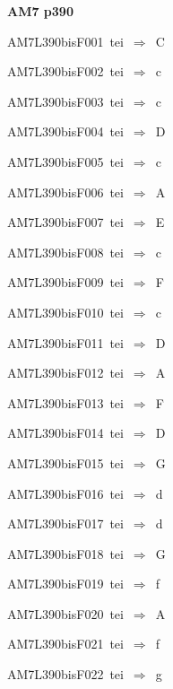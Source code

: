 \par\vfill\eject
{\bf\hfill AM7 p390\hfill\hbox{}}\par\bigskip
{\sixrm AM7L390bisF001\ {\sixit tei}\ }$\Rightarrow$\ C\par\smallskip
{\sixrm AM7L390bisF002\ {\sixit tei}\ }$\Rightarrow$\ {\tenit c}\par\smallskip
{\sixrm AM7L390bisF003\ {\sixit tei}\ }$\Rightarrow$\ {\tenit c}\par\smallskip
{\sixrm AM7L390bisF004\ {\sixit tei}\ }$\Rightarrow$\ D\par\smallskip
{\sixrm AM7L390bisF005\ {\sixit tei}\ }$\Rightarrow$\ {\tenit c}\par\smallskip
{\sixrm AM7L390bisF006\ {\sixit tei}\ }$\Rightarrow$\ A\par\smallskip
{\sixrm AM7L390bisF007\ {\sixit tei}\ }$\Rightarrow$\ E\par\smallskip
{\sixrm AM7L390bisF008\ {\sixit tei}\ }$\Rightarrow$\ {\tenit c}\par\smallskip
{\sixrm AM7L390bisF009\ {\sixit tei}\ }$\Rightarrow$\ F\par\smallskip
{\sixrm AM7L390bisF010\ {\sixit tei}\ }$\Rightarrow$\ {\tenit c}\par\smallskip
{\sixrm AM7L390bisF011\ {\sixit tei}\ }$\Rightarrow$\ D\par\smallskip
{\sixrm AM7L390bisF012\ {\sixit tei}\ }$\Rightarrow$\ A\par\smallskip
{\sixrm AM7L390bisF013\ {\sixit tei}\ }$\Rightarrow$\ F\par\smallskip
{\sixrm AM7L390bisF014\ {\sixit tei}\ }$\Rightarrow$\ D\par\smallskip
{\sixrm AM7L390bisF015\ {\sixit tei}\ }$\Rightarrow$\ G\par\smallskip
{\sixrm AM7L390bisF016\ {\sixit tei}\ }$\Rightarrow$\ {\tenit d}\par\smallskip
{\sixrm AM7L390bisF017\ {\sixit tei}\ }$\Rightarrow$\ {\tenit d}\par\smallskip
{\sixrm AM7L390bisF018\ {\sixit tei}\ }$\Rightarrow$\ G\par\smallskip
{\sixrm AM7L390bisF019\ {\sixit tei}\ }$\Rightarrow$\ {\tenit f}\par\smallskip
{\sixrm AM7L390bisF020\ {\sixit tei}\ }$\Rightarrow$\ A\par\smallskip
{\sixrm AM7L390bisF021\ {\sixit tei}\ }$\Rightarrow$\ {\tenit f}\par\smallskip
{\sixrm AM7L390bisF022\ {\sixit tei}\ }$\Rightarrow$\ {\tenit g}\par\smallskip
